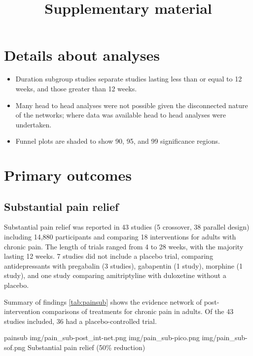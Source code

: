 \documentclass{report}\usepackage[]{graphicx}\usepackage[]{color}
\title{Supplementary material}
\begin{document}
\maketitle

\tableofcontents

\listoftables

\listoffigures


\chapter{Details about analyses}

\begin{itemize}

\item Duration subgroup studies separate studies lasting less than or equal to 12 weeks, and those greater than 12 weeks.
\item Many head to head analyses were not possible given the disconnected nature of the networks; where data was available head to head analyses were undertaken.
\item Funnel plots are shaded to show 90, 95, and 99 significance regions.

\end{itemize}


\chapter{Primary outcomes}

\section{Substantial pain relief}

Substantial pain relief was reported in 43 studies (5 crossover,  38 parallel design) including 14,880 participants and comparing 18 interventions for adults with chronic pain.  The length of trials ranged from 4 to 28 weeks, with the majority lasting 12 weeks. 7 studies did not include a placebo trial, comparing antidepressants with pregabalin (3 studies), gabapentin (1 study), morphine (1 study), and one study comparing amitriptyline with duloxetine without a placebo.

Summary of findings \ref{tab:painsub} shows the evidence network of post-intervention comparisons of treatments for chronic pain in adults. Of the 43 studies included, 36 had a placebo-controlled trial.

\soffignew
{painsub}
{img/pain_sub-post_int-net.png}
{img/pain_sub-pico.png}
{img/pain_sub-sof.png}
{Substantial pain relief (50\% reduction)}
\end{document}
